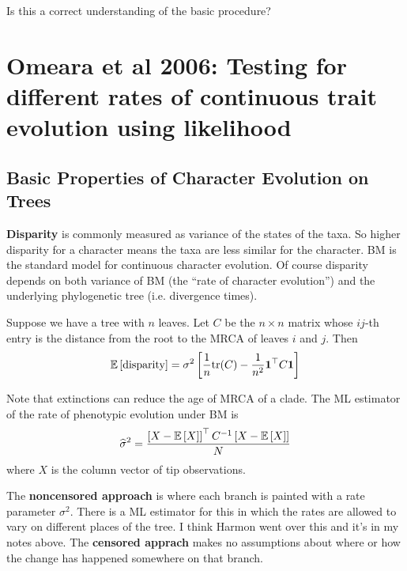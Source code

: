 \documentclass{article}
\def\[{\left [} \def\]{\right ]} \def\({\left (} \def\){\right )}
\begin{document}
Is this a correct understanding of the basic procedure?


\section{Omeara et al 2006: Testing for different rates of continuous trait evolution using likelihood}
\subsection{Basic Properties of Character Evolution on Trees}

\textbf{Disparity} is commonly measured as variance of the states of the taxa. So higher disparity for a character means the taxa are less similar for the character. BM is the standard model for continuous character evolution. Of course disparity depends on both variance of BM (the ``rate of character evolution'') and the underlying phylogenetic tree (i.e. divergence times).

Suppose we have a tree with $n$ leaves. Let $C$ be the $n\times n$ matrix whose $ij$-th entry is the distance from the root to the MRCA of leaves $i$ and $j$. Then
\begin{equation*}
  \E\[ \mathrm{disparity}\]= \sigma^{2}\left[ \frac{1}{n} \mathrm{tr}(C) - \frac{1}{n^{2}} \mathbf{1}^{\top}C \mathbf{1} \right]
\end{equation*}


Note that extinctions can reduce the age of MRCA of a clade. The ML estimator of the rate of phenotypic evolution under BM is
\begin{equation*}
  \widehat{\sigma}^{2} =  \frac{\left[ X-\E\[X \]  \right]^{\top} C^{-1}\left[ X-\E\[X \]  \right]}{N}
\end{equation*}
where $X$ is the column vector of tip observations.


The \textbf{noncensored approach} is where each branch is painted with a rate parameter $\sigma^2$. There is a ML estimator for this in which the rates are allowed to vary on different places of the tree. I think Harmon went over this and it's in my notes above. The \textbf{censored apprach} makes no assumptions about where or how the change has happened somewhere on that branch. 
\end{document}
